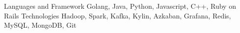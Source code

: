 

\begin{cvskills}
  \cvskill
    {Languages and Framework} %
    {Golang, Java, Python, Javascript, C++, Ruby on Rails} %
  \cvskill
    {Technologies} %
    {Hadoop, Spark, Kafka, Kylin, Azkaban, Grafana, Redis, MySQL, MongoDB, Git} %


\end{cvskills}